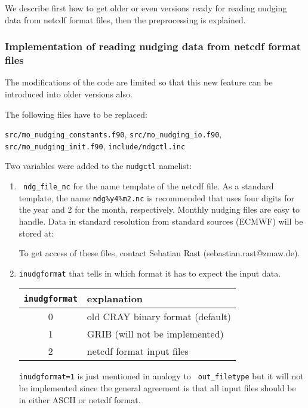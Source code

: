 \begin{appendix}
We describe first how to get older \echam{} or even \echamf{} versions
ready for reading nudging data from netcdf format files, then the
preprocessing is explained.
 
\subsubsection{Implementation of reading nudging data from netcdf format
  files}  

The modifications of the \echam{} code are limited so that this new
feature can be introduced into older \echam{} versions also. 

The following files have to be replaced:

{\tt src/mo\_nudging\_constants.f90}, {\tt src/mo\_nudging\_io.f90},
{\tt src/mo\_nudging\_init.f90}, {\tt include/ndgctl.inc}

Two variables were added to the {\tt nudgctl} namelist: 

\begin{enumerate}
\item {\tt
  ndg\_file\_nc} for the name template of the netcdf file. 
As a standard template, the name {\tt ndg\%y4\%m2.nc} is recommended
that uses four digits for the year and 2 for the month,
respectively. Monthly nudging files are easy to handle. Data in
standard resolution from standard sources (ECMWF) will be stored at:


To get access of these files, contact Sebatian
Rast (sebastian.rast@zmaw.de).
\item {\tt inudgformat} that tells \echam{} in which format it has to
  expect the input data. 

\begin{tabular*}{16cm}{c@{\extracolsep\fill}p{8cm}}\hline
{\tt inudgformat} & explanation \\\hline
0 & old CRAY binary format (default) \\
1 & GRIB (will not be implemented) \\
2 & netcdf format input files\\\hline
\end{tabular*}

{\tt inudgformat=1} is just mentioned in analogy to {\tt
  out\_filetype} but it will not be implemented since the
general agreement is that all \echam{} input files should be in either
ASCII or netcdf format.

\end{enumerate}


\end{appendix}
